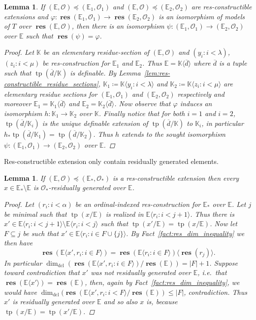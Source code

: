 \documentclass{amsart}
\newtheorem{lemma}[theorem]{Lemma}
\theoremstyle{remark}
\theoremstyle{definition}
\theoremstyle{plain}
\newcommand{\bE}{\mathbb E}
\newcommand{\bK}{\mathbb K}
\newcommand{\cO}{\mathcal O}
\DeclareMathOperator{\res}{\mathbf{res}}
\DeclareMathOperator{\tp}{\mathrm{tp}}
\DeclareMathOperator{\dcl}{\mathrm{dcl}}
\theoremstyle{plain}
\begin{document}
\begin{lemma}\label{lem:res_constructible_ext_iso_type}
    If $(\bE, \cO) \preceq (\bE_1, \cO_1)$ and $(\bE, \cO) \preceq (\bE_2, \cO_2)$ are res-constructible extensions and $\varphi: \res(\bE_1, \cO_1) \to \res(\bE_2, \cO_2)$ is an isomorphism of models of $T$ over $\res(\bE, \cO)$, then there is an isomorphism $\psi: (\bE_1, \cO_1) \to (\bE_2, \cO_2)$ over $\bE$ such that $\res(\psi)=\varphi$.
    \begin{proof}
        Let $\bK$ be an elementary residue-section of $(\bE, \cO)$ and $(y_i: i< \lambda)$, $(z_i: i< \mu)$ be res-construction for $\bE_1$ and $\bE_2$. Thus $\bE= \bK \langle \overline{d} \rangle$ where $\overline{d}$ is a tuple such that $\tp(\overline{d}/\bK)$ is definable.
        By Lemma~\ref{lem:res-constructible_residue_sections}, $\bK_1\coloneqq \bK \langle y_i: i< \lambda \rangle$ and $\bK_2\coloneqq \bK \langle z_i : i < \mu\rangle$ are elementary residue sections for $(\bE_1,\cO_1)$ and $(\bE_2, \cO_2)$ respectively and moreover $\bE_1 = \bK_1 \langle \overline{d}\rangle$ and $\bE_2 = \bK_2 \langle \overline{d} \rangle$.
        Now observe that $\varphi$ induces an isomorphism $h: \bK_1 \to \bK_2$ over $\bK$. Finally notice that for both $i=1$ and $i=2$, $\tp(\overline{d}/\bK_i)$ is the unique definable extension of $\tp(\overline{d}/\bK)$ to $\bK_i$, in particular $h_* \tp(\overline{d}/\bK_1)=\tp(\overline{d}/\bK_2)$. Thus $h$ extends to the sought isomorphism $\psi: (\bE_1, \cO_1) \to (\bE_2, \cO_2)$ over $\bE$. 
    \end{proof}
\end{lemma}

Res-constructible extension only contain residually generated elements.

\begin{lemma}\label{lem:res_implies_no_weak_elements}
    If $(\bE, \cO) \preceq (\bE_*, \cO_*)$ is a res-constructible extension then every $x \in \bE_* \setminus \bE$ is $\cO_*$-residually generated over $\bE$.
    \begin{proof}
        Let $(r_i: i< \alpha)$ be an ordinal-indexed res-construction for $\bE_*$ over $\bE$. Let $j$ be minimal such that $\tp(x/\bE)$ is realized in $\bE \langle r_i: i < j+1 \rangle$. Thus there is $x' \in \bE \langle r_i: i < j+1 \rangle \setminus \bE \langle r_i: i<j \rangle$ such that $\tp(x'/\bE)=\tp(x/\bE)$. Now let $F \subseteq j$ be such that $x' \in \bE \langle r_i : i \in F\cup\{j\}\rangle$. By Fact~\ref{fact:res_dim_inequality} we then have
        \[\res(\bE\langle x ', r_i: i \in F\rangle) = \res(\bE\langle r_i: i \in F \rangle)\langle \res(r_j) \rangle.\]
        In particular $\dim_{\dcl} (\res(\bE\langle  x ', r_i: i \in F\rangle)/\res(\bE))=|F|+1$.
        Suppose toward contradiction that $x'$ was not residually generated over $\bE$, i.e.\ that $\res(\bE\langle x '\rangle) = \res (\bE)$, then, again by Fact~\ref{fact:res_dim_inequality}, we would have $\dim_{\dcl} (\res(\bE\langle x', r_i :i<F\rangle/\res(\bE))\le |F|$, contradiction. Thus $x'$ is residually generated over $\bE$ and so also $x$ is, because $\tp(x/\bE)=\tp(x'/\bE)$.
    \end{proof}
\end{lemma}
\end{document}
